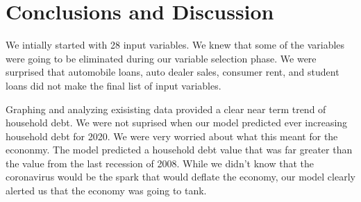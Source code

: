 \documentclass[sigconf,nonacm,11pt]{acmart}
\begin{document}
\section{Conclusions and Discussion}


We intially started with 28 input variables. We knew that some of the variables were going to be eliminated during our variable selection phase. We were surprised that automobile loans, auto dealer sales, consumer rent, and student loans did not make the final list of input variables. 

Graphing and analyzing exisisting data provided a clear near term trend of household debt. We were not suprised when our model predicted ever increasing household debt for 2020. We were very worried about what this meant for the econonmy. The model predicted a household debt value that was far greater than the value from the last recession of 2008.  While we didn't know that the coronavirus would be the spark that would deflate the economy, our model clearly alerted us that the economy was going to tank.


\end{document}
